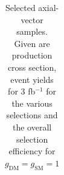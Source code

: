 \begin{table}[h!]
\begin{tabular}{lllllll}
\hline
\hline
\end{tabular}
\caption{Selected axial-vector samples. Given are production cross section, event yields for 3 fb$^{-1 }$ for the various selections and the overall selection efficiency for $g_\textrm{DM}=g_\textrm{SM}=1$}
\label{tab:dm_A_g1_3fb}
\end{table}


